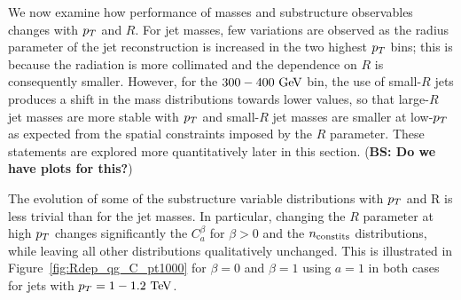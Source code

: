 We now examine how performance of masses and substructure observables changes with $p_T$ and $R$. For jet masses, few variations are observed as the 
radius parameter of the jet reconstruction is increased in the two highest $p_T$ bins; this is because the radiation
is more collimated and the dependence on $R$ is consequently smaller.
However, for the $300-400\GeV$ bin, the use of small-$R$ jets produces a shift in the
mass distributions towards lower values, so that large-$R$ jet masses are more stable
with $p_T$ and small-$R$ jet masses are smaller at low-$p_T$ as expected from the spatial
constraints imposed by the $R$ parameter. These statements are explored more 
quantitatively later in this section. ({\bf BS: Do we have plots for this?})

The evolution of some of the substructure variable distributions with $p_T$ and R is less trivial than
 for the jet masses. In particular, changing the $R$ parameter at high $p_T$ changes significantly the $C_a^{\beta}$
for $\beta>0$ and the $n_{\rm constits}$ distributions, while leaving all other distributions qualitatively unchanged. 
This is illustrated in Figure~\ref{fig:Rdep_qg_C_pt1000} for $\beta=0$ and $\beta=1$ using $a=1$ in both cases for
jets with $\pt=1-1.2\TeV$. 

